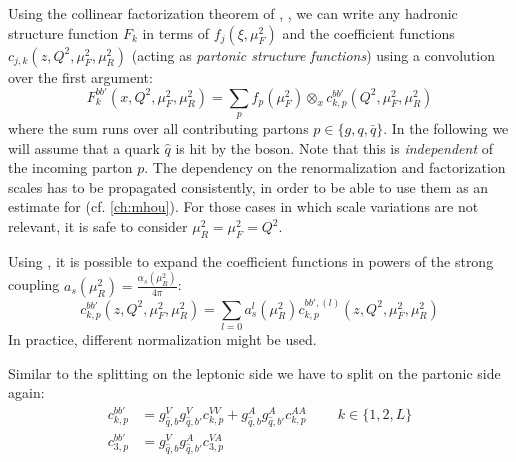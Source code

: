 
Using the collinear factorization theorem of \dis, \cite{Collins:1989gx}, we
can write any hadronic structure function $F_k$ in terms of \pdf
$f_j(\xi,\mu_F^2)$ and the coefficient functions $c_{j,k}(z,
Q^2,\mu_F^2,\mu_R^2)$ (acting as \textit{partonic structure functions}) using a
convolution over the first argument:
\begin{equation}
    F_k^{bb'}(x,Q^2,\mu_F^2,\mu_R^2) = \sum_{p} f_p(\mu_F^2) \otimes_x c_{k,p}^{bb'}(Q^2,\mu_F^2,\mu_R^2)
\end{equation}
where the sum runs over all contributing partons $p\in\{g,q,\bar q\}$. In the
following we will assume that a quark $\hat q$ is hit by the boson. Note that
this is \textit{independent} of the incoming parton $p$.
%
The dependency on the renormalization and factorization scales has to be
propagated consistently, in order to be able to use them as an estimate for
\mhou (cf. \cref{ch:mhou}).
For those cases in which scale variations are not relevant, it is safe to
consider $\mu_R^2 = \mu_F^2 = Q^2$.

Using \pqcd, it is possible to expand the coefficient functions in powers of
the strong coupling $a_s(\mu_R^2) = \frac{\alpha_s(\mu_R^2)}{4\pi}$:
\begin{equation}
    c_{k,p}^{bb'}(z, Q^2,\mu_F^2,\mu_R^2) = \sum_{l=0} a_s^l(\mu_R^2) c_{k,p}^{bb',(l)}(z, Q^2,\mu_F^2,\mu_R^2)
\end{equation}
In practice, different normalization might be used.

Similar to the splitting on the leptonic side we have to split on the partonic
side again:
\begin{align}
    c_{k,p}^{bb'} &= g_{\hat q,b}^V g_{\hat q,b'}^V c_{k,p}^{VV} + g_{\hat q,b}^A g_{\hat q,b'}^A c_{k,p}^{AA} \qquad~ k\in\{1,2,L\} \\
    c_{3,p}^{bb'} &= g_{\hat q,b}^V g_{\hat q,b'}^A c_{3,p}^{VA}
\end{align}

